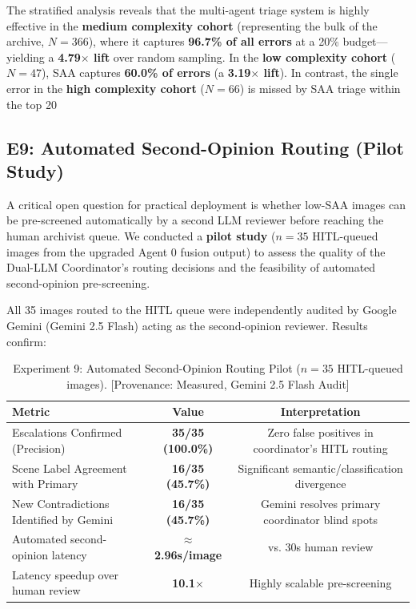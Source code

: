 \documentclass[12pt,onecolumn,a4paper]{IEEEtran}
\begin{document}
The stratified analysis reveals that the multi-agent triage system is highly effective in the \textbf{medium complexity cohort} (representing the bulk of the archive, $N=366$), where it captures \textbf{96.7\% of all errors} at a 20\% budget—yielding a \textbf{4.79$\times$ lift} over random sampling. In the \textbf{low complexity cohort} ($N=47$), SAA captures \textbf{60.0\% of errors} (a \textbf{3.19$\times$ lift}). In contrast, the single error in the \textbf{high complexity cohort} ($N=66$) is missed by SAA triage within the top 20%

\subsection{E9: Automated Second-Opinion Routing (Pilot Study)}
\label{sec:second_opinion_routing}
A critical open question for practical deployment is whether low-SAA images can be pre-screened automatically by a second LLM reviewer before reaching the human archivist queue. We conducted a \textbf{pilot study} ($n = 35$ HITL-queued images from the upgraded Agent 0 fusion output) to assess the quality of the Dual-LLM Coordinator's routing decisions and the feasibility of automated second-opinion pre-screening.

All 35 images routed to the HITL queue were independently audited by Google Gemini (Gemini 2.5 Flash) acting as the second-opinion reviewer. Results confirm:

\begin{table}[!htbp]
\centering
\caption{Experiment 9: Automated Second-Opinion Routing Pilot ($n=35$ HITL-queued images). [Provenance: Measured, Gemini 2.5 Flash Audit]}
\label{tab:second_opinion_routing}
\begin{tabular}{lcc}
\toprule
\textbf{Metric} & \textbf{Value} & \textbf{Interpretation} \\
\midrule
Escalations Confirmed (Precision) & \textbf{35/35 (100.0\%)} & Zero false positives in coordinator's HITL routing \\
Scene Label Agreement with Primary & \textbf{16/35 (45.7\%)} & Significant semantic/classification divergence \\
New Contradictions Identified by Gemini & \textbf{16/35 (45.7\%)} & Gemini resolves primary coordinator blind spots \\
Automated second-opinion latency & \textbf{$\approx$2.96s/image} & vs. 30s human review \\
Latency speedup over human review & \textbf{10.1$\times$} & Highly scalable pre-screening \\
\bottomrule
\end{tabular}
\end{table}
\end{document}
